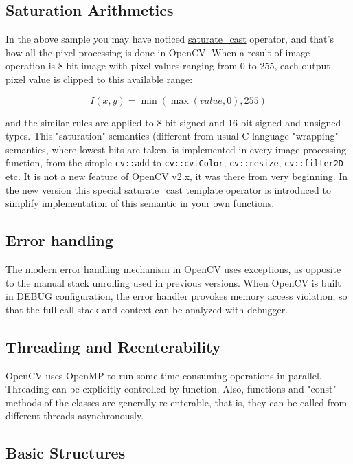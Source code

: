 \subsection{Saturation Arithmetics}

In the above sample you may have noticed \hyperref[saturatecast]{saturate\_cast} operator, and that's how all the pixel processing is done in OpenCV. When a result of image operation is 8-bit image with pixel values ranging from 0 to 255, each output pixel value is clipped to this available range:

\[
I(x,y)=\min(\max(value, 0), 255)
\]

and the similar rules are applied to 8-bit signed and 16-bit signed and unsigned types. This "saturation" semantics (different from usual C language "wrapping" semantics, where lowest bits are taken, is implemented in every image processing function, from the simple \texttt{cv::add} to \texttt{cv::cvtColor}, \texttt{cv::resize}, \texttt{cv::filter2D} etc.
It is not a new feature of OpenCV v2.x, it was there from very beginning. In the new version this special \hyperref[saturatecast]{saturate\_cast} template operator is introduced to simplify implementation of this semantic in your own functions.


\subsection{Error handling}

The modern error handling mechanism in OpenCV uses exceptions, as opposite to the manual stack unrolling used in previous versions. When OpenCV is built in DEBUG configuration, the error handler provokes memory access violation, so that the full call stack and context can be analyzed with debugger.

\subsection{Threading and Reenterability}

OpenCV uses OpenMP to run some time-consuming operations in parallel. Threading can be explicitly controlled by  function. Also, functions and "const" methods of the classes are generally re-enterable, that is, they can be called from different threads asynchronously.

\subsection{Basic Structures}

